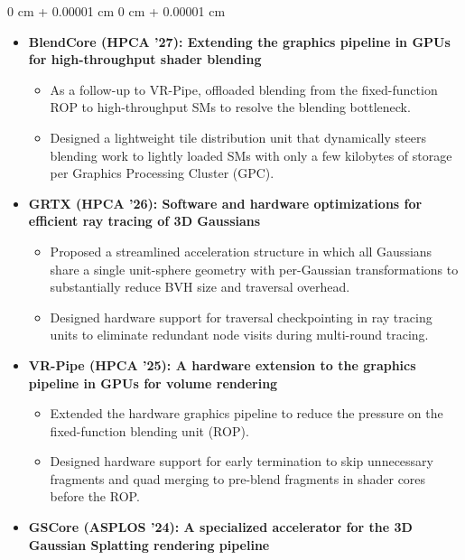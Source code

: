 \documentclass[10pt, letterpaper]{article}
\newenvironment{highlights}{
  \begin{itemize}[
    topsep=0.10 cm,
    parsep=0.10 cm,
    partopsep=0pt,
    itemsep=0.12 cm,
    leftmargin=0 cm + 10pt
  ]
}{
  \end{itemize}
} %
\newenvironment{onecolentry}{
  \begin{adjustwidth}{
    0 cm + 0.00001 cm
  }{
    0 cm + 0.00001 cm
  }
}{
  \end{adjustwidth}
} %
\let\hrefWithoutArrow\href
\begin{document}
    \vspace{0.10 cm}
    \begin{onecolentry}
      \begin{highlights}
        \item \textbf{BlendCore (HPCA '27): Extending the graphics pipeline in GPUs for high-throughput shader blending}
        \begin{itemize}
            \item As a follow-up to VR-Pipe, offloaded blending from the fixed-function ROP to high-throughput SMs to resolve the blending bottleneck.
            \item Designed a lightweight tile distribution unit that dynamically steers blending work to lightly loaded SMs with only a few kilobytes of storage per Graphics Processing Cluster (GPC).
        \end{itemize}
        \item \textbf{GRTX (HPCA '26): Software and hardware optimizations for efficient ray tracing of 3D Gaussians}
        \begin{itemize}
            \item Proposed a streamlined acceleration structure in which all Gaussians share a single unit-sphere geometry with per-Gaussian transformations to substantially reduce BVH size and traversal overhead.
            \item Designed hardware support for traversal checkpointing in ray tracing units to eliminate redundant node visits during multi-round tracing.
        \end{itemize}
        \item \textbf{VR-Pipe (HPCA '25): A hardware extension to the graphics pipeline in GPUs for volume rendering}
        \begin{itemize}
            \item Extended the hardware graphics pipeline to reduce the pressure on the fixed-function blending unit (ROP).
            \item Designed hardware support for early termination to skip unnecessary fragments and quad merging to pre-blend fragments in shader cores before the ROP.
        \end{itemize}
        \item \textbf{GSCore (ASPLOS '24): A specialized accelerator for the 3D Gaussian Splatting rendering pipeline}
        \begin{itemize}

\end{itemize}
\end{highlights}
\end{onecolentry}
\end{document}
